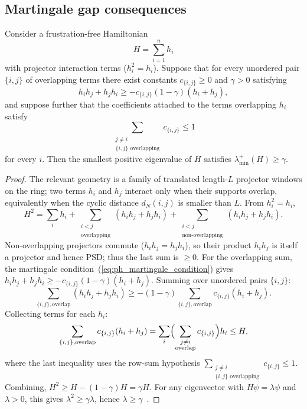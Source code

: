 \subsection{Martingale gap consequences}\label{subsec:spectral_gap_martingale}

\begin{theorem}\label{thm:martingale_criterion}
    \notready
    Consider a frustration-free Hamiltonian
    \[
        H = \sum_{i=1}^n h_i
    \]
    with projector interaction terms ($h_i^2 = h_i$).
    Suppose that for every unordered pair $\{i,j\}$ of overlapping terms there
    exist constants $c_{\{i,j\}} \ge 0$ and $\gamma > 0$ satisfying
    \begin{equation}\label{eq:ph_martingale_condition}
        h_i h_j + h_j h_i
        \ge -c_{\{i,j\}}(1-\gamma)(h_i + h_j),
    \end{equation}
    and suppose further that the coefficients attached to the terms overlapping
    $h_i$ satisfy
    \[
        \sum_{\substack{j\ne i\\ \{i,j\}\text{ overlapping}}}c_{\{i,j\}}\le1
    \]
    for every $i$.
    Then the smallest positive eigenvalue of $H$ satisfies
    $\lambda_{\min}^+(H) \ge \gamma$.
\end{theorem}

\begin{proof}
    \notready
    The relevant geometry is a family of translated length-$L$ projector
    windows on the ring; two terms $h_i$ and $h_j$ interact only when their
    supports overlap, equivalently when the cyclic distance $d_N(i,j)$ is
    smaller than $L$.
    From $h_i^2 = h_i$,
    \[
        H^2 = \sum_i h_i + \sum_{\substack{i < j \\ \text{overlapping}}}
        (h_i h_j + h_j h_i) + \sum_{\substack{i < j \\ \text{non-overlapping}}}
        (h_i h_j + h_j h_i).
    \]
    Non-overlapping projectors commute ($h_i h_j = h_j h_i$), so their
    product $h_i h_j$ is itself a projector and hence PSD; thus the last
    sum is $\ge 0$.
    For the overlapping sum, the martingale condition~(\ref{eq:ph_martingale_condition}) gives
    $h_i h_j + h_j h_i \ge -c_{\{i,j\}}(1-\gamma)(h_i + h_j)$.
    Summing over unordered pairs $\{i,j\}$:
    \[
        \sum_{\{i,j\}, \text{overlap}} (h_i h_j + h_j h_i)
        \ge -(1-\gamma) \sum_{\{i,j\}, \text{overlap}}
        c_{\{i,j\}}(h_i + h_j).
    \]
    Collecting terms for each $h_i$:
    \[
        \sum_{\{i,j\}, \text{overlap}} c_{\{i,j\}}(h_i + h_j)
        = \sum_i \Bigl(\sum_{\substack{j \ne i \\ \text{overlap}}}
        c_{\{i,j\}}\Bigr) h_i
        \le H,
    \]
    where the last inequality uses the row-sum hypothesis
    $\sum_{\substack{j\ne i\\ \{i,j\}\text{ overlapping}}}c_{\{i,j\}}\le1$.
    Combining, $H^2 \ge H - (1-\gamma)H = \gamma H$.
    For any eigenvector with $H\psi = \lambda\psi$ and $\lambda > 0$,
    this gives $\lambda^2 \ge \gamma\lambda$, hence
    $\lambda \ge \gamma$~\cite{Kastoryano2018Martingale}.
\end{proof}

